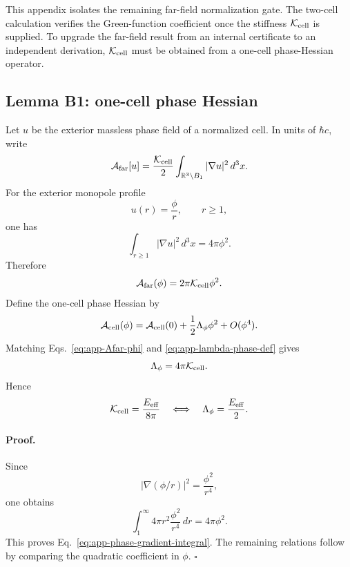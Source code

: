 \documentclass[11pt]{article}
\begin{document}
This appendix isolates the remaining far-field normalization gate.  The
two-cell calculation verifies the Green-function coefficient once the stiffness
\(\mathcal K_{\rm cell}\) is supplied.  To upgrade the far-field result from an
internal certificate to an independent derivation, \(\mathcal K_{\rm cell}\)
must be obtained from a one-cell phase-Hessian operator.

\subsection{Lemma B1: one-cell phase Hessian}

Let \(u\) be the exterior massless phase field of a normalized cell.  In units
of \(\hbar c\), write
\begin{equation}
  \mathcal A_{\rm far}[u]
  =
  \frac{\mathcal K_{\rm cell}}{2}
  \int_{\mathbb R^3\setminus B_1}
  |\nabla u|^2\,d^3x .
  \label{eq:app-farfield-energy-K}
\end{equation}
For the exterior monopole profile
\begin{equation}
  u(r)=\frac{\phi}{r},
  \qquad r\ge1,
\end{equation}
one has
\begin{equation}
  \int_{r\ge1}
  |\nabla u|^2\,d^3x
  =
  4\pi\phi^2 .
  \label{eq:app-phase-gradient-integral}
\end{equation}
Therefore
\begin{equation}
  \mathcal A_{\rm far}(\phi)
  =
  2\pi\mathcal K_{\rm cell}\phi^2 .
  \label{eq:app-Afar-phi}
\end{equation}
Define the one-cell phase Hessian by
\begin{equation}
  \mathcal A_{\rm cell}(\phi)
  =
  \mathcal A_{\rm cell}(0)
  +
  \frac{1}{2}\Lambda_\phi\phi^2
  +
  O(\phi^4).
  \label{eq:app-lambda-phase-def}
\end{equation}
Matching Eqs.~\eqref{eq:app-Afar-phi} and
\eqref{eq:app-lambda-phase-def} gives
\begin{equation}
  \Lambda_\phi=4\pi\mathcal K_{\rm cell}.
  \label{eq:app-lambda-K}
\end{equation}
Hence
\begin{equation}
  \mathcal K_{\rm cell}
  =
  \frac{E_{\rm eff}}{8\pi}
  \quad\Longleftrightarrow\quad
  \Lambda_\phi=\frac{E_{\rm eff}}{2}.
  \label{eq:app-Kcell-Lambda-target}
\end{equation}

\paragraph{Proof.}
Since
\[
  |\nabla(\phi/r)|^2=\frac{\phi^2}{r^4},
\]
one obtains
\[
  \int_1^\infty 4\pi r^2\frac{\phi^2}{r^4}\,dr=4\pi\phi^2.
\]
This proves Eq.~\eqref{eq:app-phase-gradient-integral}.  The remaining
relations follow by comparing the quadratic coefficient in \(\phi\). \(\square\)
\end{document}
